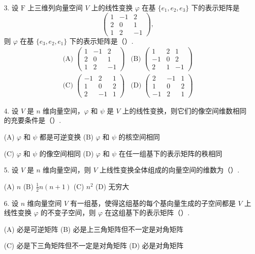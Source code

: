 \documentclass[UTF8, 12pt, fontset=fandol, oneside]{ctexart}
\begin{document}
3. 设 $\mathrm{F}$ 上三维列向量空间 $V$ 上的线性变换 $\varphi$ 在基 $\{e_1,e_2,e_3\}$ 下的表示矩阵是
\[
\left(\begin{array}{rrr}
1 & -1 & 2\\
2 & 0 & 1\\
1 & 2 & -1
\end{array}\right),
\]
则 $\varphi$ 在基 $\{e_3,e_2,e_1\}$ 下的表示矩阵是（\quad）.
\[
\begin{array}{ll}
\text{(A) }\left(\begin{array}{rrr}1&-1&2\\2&0&1\\1&2&-1\end{array}\right)
&
\text{(B) }\left(\begin{array}{rrr}1&2&1\\-1&0&2\\2&1&-1\end{array}\right)
\\[1.2em]
\text{(C) }\left(\begin{array}{rrr}-1&2&1\\1&0&2\\2&-1&1\end{array}\right)
&
\text{(D) }\left(\begin{array}{rrr}2&-1&1\\1&0&2\\-1&2&1\end{array}\right)
\end{array}
\]

4. 设 $V$ 是 $n$ 维向量空间，$\varphi$ 和 $\psi$ 是 $V$ 上的线性变换，则它们的像空间维数相同的充要条件是（\quad）.

(A) $\varphi$ 和 $\psi$ 都是可逆变换 \hfill (B) $\varphi$ 和 $\psi$ 的核空间相同

(C) $\varphi$ 和 $\psi$ 的像空间相同 \hfill (D) $\varphi$ 和 $\psi$ 在任一组基下的表示矩阵的秩相同

5. 设 $V$ 是 $n$ 维向量空间，则 $V$ 上线性变换全体组成的向量空间的维数为（\quad）.

(A) $n$ \hfill (B) $\frac12n(n+1)$ \hfill (C) $n^2$ \hfill (D) 无穷大

6. 设 $n$ 维向量空间 $V$ 有一组基，使得这组基的每个基向量生成的子空间都是 $V$ 上线性变换 $\varphi$ 的不变子空间，则 $\varphi$ 在这组基下的表示矩阵（\quad）.

(A) 必是可逆矩阵 \hfill (B) 必是上三角矩阵但不一定是对角矩阵

(C) 必是下三角矩阵但不一定是对角矩阵 \hfill (D) 必是对角矩阵
\end{document}
